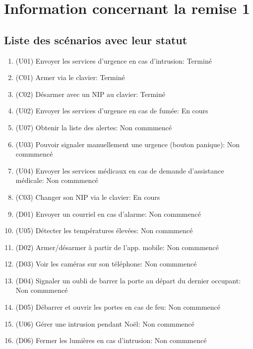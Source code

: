 
\chapter*{Information concernant la remise 1}

\section*{Liste des scénarios avec leur statut}
\begin{enumerate}
	\item (U01) Envoyer les services d'urgence en cas d'intrusion: Terminé
	\item (C01) Armer via le clavier: Terminé
	\item (C02) Désarmer avec un NIP au clavier: Terminé
	\item (U02) Envoyer les services d'urgence en cas de fumée: En cours
	\item (U07) Obtenir la liste des alertes: Non commmencé
	\item (U03) Pouvoir signaler manuellement une urgence (bouton panique): Non commmencé
	\item (U04) Envoyer les services médicaux en cas de demande d'assistance médicale: Non commmencé
	\item (C03) Changer son NIP via le clavier: En cours
	\item (D01) Envoyer un courriel en cas d'alarme: Non commmencé
	\item (U05) Détecter les températures élevées: Non commmencé
	\item (D02) Armer/désarmer à partir de l'app. mobile: Non commmencé
	\item (D03) Voir les caméras sur son téléphone: Non commmencé
	\item (D04) Signaler un oubli de barrer la porte au départ du dernier occupant: Non commmencé
	\item (D05) Débarrer et ouvrir les portes en cas de feu: Non commmencé
	\item (U06) Gérer une intrusion pendant Noël: Non commmencé
	\item (D06) Fermer les lumières en cas d'intrusion: Non commmencé
\end{enumerate}


